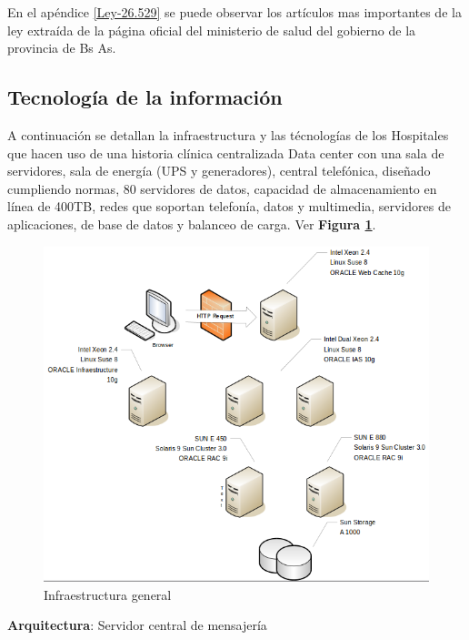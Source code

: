 En el apéndice \ref{Ley-26.529} se puede observar los artículos mas importantes de la ley extraída de la página oficial del ministerio de salud del gobierno de la provincia de Bs As.




\subsection{Tecnología de la información}
 A continuación se detallan la infraestructura y las técnologías de los Hospitales que hacen uso de una historia clínica centralizada
 Data center con una sala de servidores, sala de energía (UPS y generadores), central telefónica, diseñado cumpliendo normas, 80 servidores de datos, capacidad de almacenamiento en línea de 400TB, redes que soportan telefonía, datos y multimedia, servidores de aplicaciones, de base de datos y balanceo de carga.
 Ver \textbf{Figura \ref{infgen}}.
 
\begin{figure}
  \centering
  \includegraphics[width=.8\textwidth]{img/tp1/modeloGrande}
  \caption{Infraestructura general}
  \label{infgen}
\end{figure}

    \textbf{Arquitectura}: Servidor central de mensajería 
    
